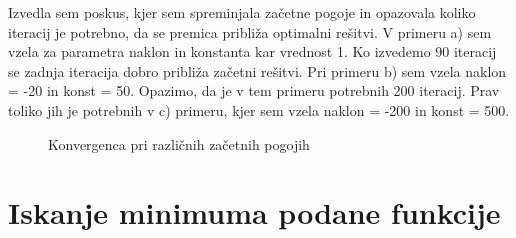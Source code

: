 \documentclass{article}
\begin{document}
\noindent Izvedla sem poskus, kjer sem spreminjala začetne pogoje in opazovala koliko iteracij je potrebno, da se premica približa optimalni rešitvi. V primeru a) sem vzela za parametra naklon in konstanta kar vrednost 1. Ko izvedemo 90 iteracij se zadnja iteracija dobro približa začetni rešitvi. Pri primeru b) sem vzela naklon = -20 in konst = 50. Opazimo, da je v tem primeru potrebnih 200 iteracij. Prav toliko jih je potrebnih v c) primeru, kjer sem vzela naklon = -200 in konst = 500. 

\begin{figure}
    \centering
    \caption{Konvergenca pri različnih začetnih pogojih}
    \label{fig:foobar}
\end{figure}


\section{Iskanje minimuma podane funkcije}
\end{document}
